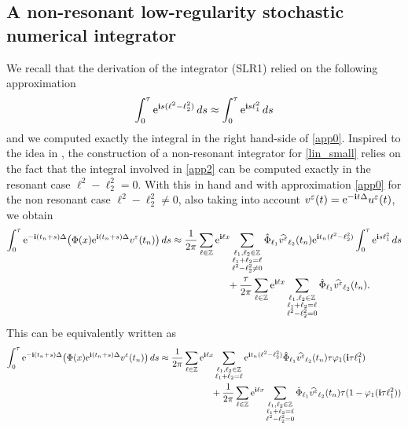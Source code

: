 \documentclass[a4paper]{amsart}
\begin{document}
\subsection{A non-resonant low-regularity stochastic numerical integrator}
We recall that the derivation of the integrator (SLR1) relied on the following approximation
\begin{equation}
    \label{app0}
\int_{0}^{\tau}{\rm e}^{{\bf i}s(\ell^2-\ell_2^2)}\,ds \approx \int_{0}^{\tau}{\rm e}^{{\bf i}s\ell_1^2}\,ds 
\end{equation}
and we computed exactly the integral in the right hand-side of \eqref{app0}. Inspired to the idea in \cite{fe_ka}, the construction of a non-resonant integrator for  \eqref{lin_small} relies on the fact that the integral involved in \eqref{app2} can be computed exactly in the resonant case $\ell^2-\ell_2^2=0$. With this in hand and with approximation \eqref{app0} for the non resonant case $\ell^2-\ell_2^2\ne 0$, also taking into account $v^\varepsilon(t)={\rm e}^{-{\bf i}t\Delta}u^\varepsilon(t)$, we obtain
\begin{align*}
\int_{0}^{\tau}{\rm e}^{-{\bf i}(t_n+s)\Delta}\big(\Phi(x){\rm e}^{{\bf i}(t_n+s)\Delta} v^\varepsilon(t_n)\big)\,ds
&\approx \frac{1}{2\pi}\displaystyle\sum_{\ell \in \mathbb{Z}}{\rm e}^{{\bf i}\ell x}\displaystyle\sum_{\substack{\ell_1,\ell_2\in\mathbb{Z}\\ \ell_1+\ell_2=\ell \\ \ell^2-\ell_2^2\ne 0}}\hat{\Phi}_{\ell_1}\widehat{v^\varepsilon}_{\ell_2}(t_n){\rm e}^{{\bf i}t_n(\ell^2-\ell_2^2)}\int_{0}^{\tau}
{\rm e}^{{\bf i}s \ell_1^2}\,ds\\
&\hspace{2cm}+\frac{\tau}{2\pi} \displaystyle\sum_{\ell \in \mathbb{Z}}{\rm e}^{{\bf i}\ell x} \displaystyle\sum_{\substack{\ell_1,\ell_2\in\mathbb{Z}\\ \ell_1+\ell_2=\ell\\ \ell^2-\ell^2_2=0}} \hat{\Phi}_{\ell_1}\widehat{v^\varepsilon}_{\ell_2}(t_n).
\end{align*}
This can be equivalently written as
\begin{align*}
    \int_{0}^{\tau}{\rm e}^{-{\bf i}(t_n+s)\Delta}\big(\Phi(x){\rm e}^{{\bf i}(t_n+s)\Delta} v^\varepsilon(t_n)\big)\,ds & \approx \frac{1}{2\pi}
    \displaystyle\sum_{\ell \in \mathbb{Z}} {\rm e}^{{\bf i}\ell x}\displaystyle\sum_{\substack{\ell_1,\ell_2\in\mathbb{Z}\\ \ell_1+\ell_2=\ell}} {\rm e}^{{\bf i}t_n (\ell^2-\ell_2^2)}\hat{\Phi}_{\ell_1}\widehat{v^\varepsilon}_{\ell_2}(t_n) \tau \varphi_1({\bf i}\tau \ell_1^2)\\
    &\hspace{2cm}+\frac{1}{2\pi}\displaystyle\sum_{\ell\in\mathbb{Z}}{\rm e}^{{\bf i}\ell x}\displaystyle\sum_{\substack{\ell_1,\ell_2\in\mathbb{Z} \\ \ell_1+\ell_2=\ell\\ \ell^2-\ell_2^2=0}} \hat{\Phi}_{\ell_1}\widehat{v^\varepsilon}_{\ell_2}(t_n)\tau (1-\varphi_1({\bf i}\tau \ell_1^2))
\end{align*}
\end{document}
